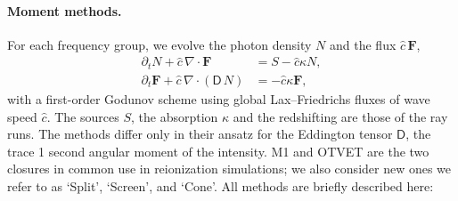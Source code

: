 \documentclass[11pt]{article}
\newcommand{\chat}{\hat{c}}
\begin{document}
\paragraph{Moment methods.} For each frequency group, we evolve the photon
density $N$ and the flux $\chat\,\mathbf F$,
\begin{align}
\partial_t N + \chat\,\nabla\cdot\mathbf F &= S - \chat\kappa N,\\
\partial_t \mathbf F + \chat\,\nabla\cdot(\mathsf D\,N) &= -\chat\kappa \mathbf F,
\end{align}
with a first-order Godunov scheme using global Lax--Friedrichs fluxes of
wave speed $\chat$. The sources $S$, the absorption $\kappa$ and the
redshifting are those of the ray runs. The methods differ only in their ansatz for the
Eddington tensor $\mathsf D$, the trace 1 second angular moment of the intensity. M1 and OTVET are the two closures
in common use in reionization simulations; we also consider new ones we refer to as `Split', `Screen', and `Cone'.  All methods are briefly described here:
\end{document}
